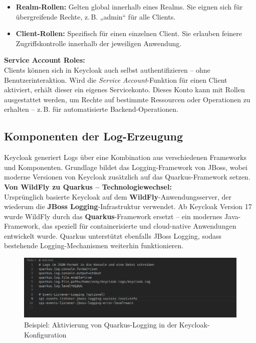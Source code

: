 \documentclass[a4paper,12pt]{article}
\let\footnote=\endnote
\begin{document}
	\begin{itemize}
		\item \textbf{Realm-Rollen:} Gelten global innerhalb eines Realms. Sie eignen sich für übergreifende Rechte, z.\,B. „admin“ für alle Clients.
		\item \textbf{Client-Rollen:} Spezifisch für einen einzelnen Client. Sie erlauben feinere Zugriffskontrolle innerhalb der jeweiligen Anwendung.
	\end{itemize}
	
	\vspace{0.5em}
	\textbf{Service Account Roles:}\\
	Clients können sich in Keycloak auch selbst authentifizieren – ohne Benutzerinteraktion. Wird die \textit{Service Account}-Funktion für einen Client aktiviert, erhält dieser ein eigenes Servicekonto. Dieses Konto kann mit Rollen ausgestattet werden, um Rechte auf bestimmte Ressourcen oder Operationen zu erhalten – z.\,B. für automatisierte Backend-Operationen.
	
	\subsection{Komponenten der Log-Erzeugung}
	Keycloak generiert Logs über eine Kombination aus verschiedenen Frameworks und Komponenten. Grundlage bildet das Logging-Framework von JBoss, wobei moderne Versionen von Keycloak zusätzlich auf das Quarkus-Framework setzen.
	\vspace{0.5em}
	\textbf{Von WildFly zu Quarkus – Technologiewechsel:}\\
	Ursprünglich basierte Keycloak auf dem \textbf{WildFly}-Anwendungsserver\footnote{\url{https://www.wildfly.org/}}, der wiederum die \textbf{JBoss Logging}-Infrastruktur verwendet. Ab Keycloak Version 17 wurde WildFly durch das \textbf{Quarkus}-Framework ersetzt – ein modernes Java-Framework, das speziell für containerisierte und cloud-native Anwendungen entwickelt wurde. Quarkus unterstützt ebenfalls JBoss Logging, sodass bestehende Logging-Mechanismen weiterhin funktionieren.
	
	\begin{figure}[H]
		\centering
		\includegraphics[width=0.9\linewidth]{screenshot008}
		\caption{Beispiel: Aktivierung von Quarkus-Logging in der Keycloak-Konfiguration}
		\label{fig:screenshot008}
	\end{figure}
	
\end{document}
